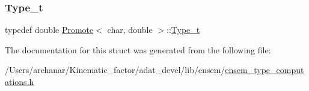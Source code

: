 \subsubsection{\texorpdfstring{Type\_t}{Type\_t}\hspace{0.1cm}{\footnotesize\ttfamily [2/2]}}
{\footnotesize\ttfamily typedef double \mbox{\hyperlink{structPromote}{Promote}}$<$ char, double $>$\+::\mbox{\hyperlink{structPromote_3_01char_00_01double_01_4_ac5f86ae4e12f2be8737cfb818bd7d82d}{Type\+\_\+t}}}



The documentation for this struct was generated from the following file\+:\begin{DoxyCompactItemize}
\item 
/\+Users/archanar/\+Kinematic\+\_\+factor/adat\+\_\+devel/lib/ensem/\mbox{\hyperlink{lib_2ensem_2ensem__type__computations_8h}{ensem\+\_\+type\+\_\+computations.\+h}}\end{DoxyCompactItemize}
